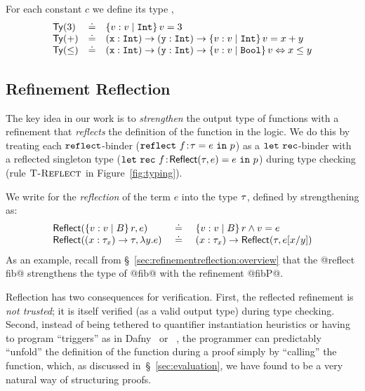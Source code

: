 For each constant $c$ we define its type , \eg%
%
$$
\begin{array}{lcl}
\constty{3} &\doteq& \tref{v}{\tint}{v = 3}\\
\constty{+} &\doteq& \tfun{\ttx}{\tint}{\tfun{\tty}{\tint}{\tref{v}{\tint}{v = x + y}}}\\
\constty{\leq} &\doteq& \tfun{\ttx}{\tint}{\tfun{\tty}{\tint}{\tref{v}{\tbool}{v \Leftrightarrow x \leq y}}}\\
\end{array}
$$
%

\subsection{Refinement Reflection}\label{subsec:logicalannotations}
%
The key idea in our work is to
\emph{strengthen} the output type of functions
with a refinement that \emph{reflects} the
definition of the function in the logic.
%
We do this by treating each
%
$\erefname$-binder
%
(${\erefb{f}{\gtyp}{e}{\prog}}$)
%
as a $\eletname$-binder with a reflected singleton type
%
(${\eletb{f}{\exacttype{\gtyp}{e}}{e}{\prog}}$)
%
during type checking (rule $\rtreflect$ in Figure~\ref{fig:typing}).

%
We write  for the \emph{reflection}
of the term $e$ into the type $\typ$,  defined by strengthening
\typ as:
%
$$
\begin{array}{lcl}
\exacttype{\tref{v}{\btyp}{r}}{e}
  & \defeq
  & \tref{v}{\btyp}{r \land v = e}\\
\exacttype{\tfun{x}{\typ_x}{\typ}}{\efun{y}{}{e}}
  & \defeq
  & \tfun{x}{\typ_x}{\exacttype{\typ}{e\subst{y}{x}}}
\end{array}
$$
%
As an example, recall from \S~\ref{sec:refinementreflection:overview}
that the @reflect fib@ strengthens the type of
@fib@ with the refinement @fibP@.


%
Reflection has two consequences for verification.
%
First, the reflected refinement is \emph{not trusted};
it is itself verified (as a valid output type)
during type checking.
%
Second, instead of being tethered to quantifier
instantiation heuristics or having to program
``triggers'' as in Dafny~\citep{dafny} or
\fstar~\citep{fstar},
%
the programmer can predictably ``unfold'' the
definition of the function during a proof simply
by ``calling'' the function, which, as discussed
in~\S~\ref{sec:evaluation}, we have found to be
a very natural way of structuring proofs.


